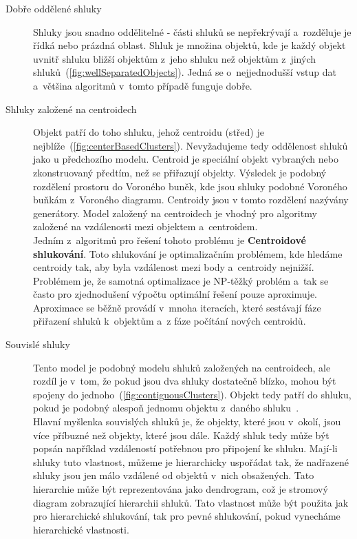 \begin{description}
\item[Dobře oddělené shluky] Shluky jsou snadno oddělitelné - části shluků se ne\-pře\-krý\-va\-jí a~rozděluje je řídká nebo prázdná oblast. Shluk je množina objektů, kde je každý objekt uvnitř shluku bližší objektům z~jeho shluku než objektům z~jiných shluků~(\autoref{fig:wellSeparatedObjects}). Jedná se o~nejjednodušší vstup dat a~většina algoritmů v~tomto případě funguje dobře.

\item[Shluky založené na centroidech] Objekt patří do toho shluku, jehož centroidu (střed) je nejblíže~(\autoref{fig:centerBasedClusters}). Nevyžadujeme tedy oddělenost shluků jako u předchozího modelu. Centroid je speciální objekt vybraných nebo zkonstruovaný předtím, než se přiřazují objekty. Výsledek je podobný rozdělení prostoru do Voroného buněk, kde jsou shluky podobné Voroného buňkám z~Voroného diagramu. Centroidy jsou v tomto rozdělení nazývány generátory. Model založený na centroidech je vhodný pro algoritmy založené na vzdálenosti mezi objektem a~centroidem.\\

Jedním z~algoritmů pro řešení tohoto problému je \textbf{Centroidové shlukování}. Toto shlukování je optimalizačním problémem, kde hledáme centroidy tak, aby byla vzdálenost mezi body a~centroidy nejnižší. Problémem je, že samotná optimalizace je NP-těžký problém a~tak se často pro zjednodušení výpočtu optimální řešení pouze aproximuje. Aproximace se běžně provádí v~mnoha iteracích, které sestávají fáze přiřazení shluků k~objektům a~z fáze počítání nových centroidů.

\item[Souvislé shluky] Tento model je podobný modelu shluků založených na centroidech, ale rozdíl je v~tom, že pokud jsou dva shluky dostatečně blízko, mohou být spojeny do jednoho~(\autoref{fig:contiguousClusters}). Objekt tedy patří do shluku, pokud je podobný alespoň jednomu objektu z~daného shluku~\cite{Tan05}. \\

Hlavní myšlenka souvislých shluků je, že objekty, které jsou v~okolí, jsou více příbuzné než objekty, které jsou dále. Každý shluk tedy může být popsán například vzdáleností potřebnou pro připojení ke shluku. Mají-li shluky tuto vlastnost, můžeme je hierarchicky uspořádat tak, že nadřazené shluky jsou jen málo vzdálené od objektů v~nich obsažených. Tato hierarchie může být reprezentována jako dendrogram, což je stromový diagram zobrazující hierarchii shluků. Tato vlastnost může být použita jak pro hierarchické shlukování, tak pro pevné shlukování, pokud vynecháme hierarchické vlastnosti. \\


\end{description}
